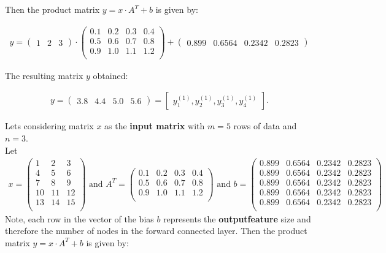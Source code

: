 Then the product matrix $y = x \cdot A^T + b$ is given by:


\begin{align}
	y = \begin{pmatrix}
		1 & 2 & 3 
	\end{pmatrix} \cdot \begin{pmatrix}
		0.1 & 0.2 & 0.3 & 0.4 \\
		0.5 & 0.6 & 0.7 & 0.8 \\
		0.9 & 1.0 & 1.1 & 1.2 \\
	\end{pmatrix} + \begin{pmatrix}
		0.899 & 0.6564 & 0.2342 & 0.2823
	\end{pmatrix}
\end{align}

The resulting matrix $y$ obtained:

\begin{align}
	y = \begin{pmatrix}
		3.8 & 4.4 & 5.0 & 5.6 
	\end{pmatrix} = \begin{bmatrix}
		y^{(1)}_1, y^{(1)}_2,  y^{(1)}_3, y^{(1)}_4
	\end{bmatrix}.
\end{align}

Lets considering matrix $x$ as the \textbf{input matrix} with  $m=5$ rows of data and $n=3$.\\

Let
\begin{align} 
	x = \begin{pmatrix}
		1 & 2 & 3 \\
		4 & 5 & 6 \\
		7 & 8 & 9 \\
		10 & 11 & 12 \\
		13 & 14 & 15 \\
	\end{pmatrix}
	\text{ and }
	A^T = \begin{pmatrix}
		0.1 & 0.2 & 0.3 & 0.4 \\
		0.5 & 0.6 & 0.7 & 0.8 \\
		0.9 & 1.0 & 1.1 & 1.2 \\
	\end{pmatrix}\text{ and } b= \begin{pmatrix}
		0.899 & 0.6564 & 0.2342 & 0.2823\\
		0.899 & 0.6564 & 0.2342 & 0.2823\\
		0.899 & 0.6564 & 0.2342 & 0.2823\\
		0.899 & 0.6564 & 0.2342 & 0.2823\\
		0.899 & 0.6564 & 0.2342 & 0.2823\\
	\end{pmatrix}
\end{align}
Note, each row in the vector of the bias $b$ represents the \textbf{outputfeature} size and therefore the number of nodes in the forward connected layer. 
Then the product matrix $y = x \cdot A^T + b$ is given by:


